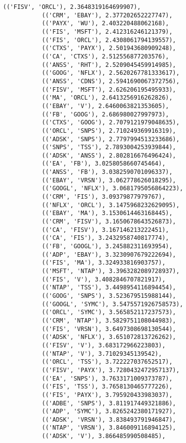 \documentclass[11pt]{article}
\begin{document}
\begin{Verbatim}[commandchars=\\\{\}]
           (('FISV', 'ORCL'), 2.3648319164699907),
           (('CRM', 'EBAY'), 2.377202652227747),
           (('PAYX', 'WU'), 2.403220488062168),
           (('FIS', 'MSFT'), 2.412316246121379),
           (('FIS', 'ORCL'), 2.4308061794139557),
           (('CTXS', 'PAYX'), 2.501943680909248),
           (('CA', 'CTXS'), 2.512556877203576),
           (('ANSS', 'RHT'), 2.5209045459914985),
           (('GOOG', 'NFLX'), 2.5620267781333617),
           (('ANSS', 'CDNS'), 2.5941690067372756),
           (('FISV', 'MSFT'), 2.626206195495933),
           (('MA', 'ORCL'), 2.6413256916262826),
           (('EBAY', 'V'), 2.6460063821353605),
           (('FB', 'GOOG'), 2.686980027997973),
           (('CTXS', 'GOOG'), 2.7079121979048635),
           (('ORCL', 'SNPS'), 2.710249369916319),
           (('ADSK', 'SNPS'), 2.7797994513233686),
           (('SNPS', 'TSS'), 2.7893004253939844),
           (('ADSK', 'ANSS'), 2.802816676496424),
           (('EA', 'FB'), 3.0258058660745464),
           (('ANSS', 'FB'), 3.0382590701096337),
           (('EBAY', 'VRSN'), 3.062778626018295),
           (('GOOGL', 'NFLX'), 3.0681795056864223),
           (('CRM', 'FIS'), 3.09379877979767),
           (('NFLX', 'ORCL'), 3.1475968232629095),
           (('EBAY', 'MA'), 3.1530614463168445),
           (('CRM', 'FISV'), 3.1650678643526873),
           (('CA', 'FISV'), 3.167146213222451),
           (('CA', 'FIS'), 3.2432958740817774),
           (('FB', 'GOOGL'), 3.245882311693954),
           (('ADP', 'EBAY'), 3.3230907679222694),
           (('FIS', 'MA'), 3.324933816903757),
           (('MSFT', 'NTAP'), 3.3963282089728937),
           (('FIS', 'V'), 3.4082846707821917),
           (('NTAP', 'TSS'), 3.4498954116894454),
           (('GOOG', 'SNPS'), 3.523679515988144),
           (('GOOGL', 'SYMC'), 3.5475571926758573),
           (('ORCL', 'SYMC'), 3.565852117237573),
           (('CRM', 'NTAP'), 3.5829751108044983),
           (('FIS', 'VRSN'), 3.6497308698130544),
           (('ADSK', 'NFLX'), 3.651072813726262),
           (('FISV', 'V'), 3.683172966223803),
           (('NTAP', 'V'), 3.71029345139542),
           (('ORCL', 'TSS'), 3.722227037652517),
           (('FISV', 'PAYX'), 3.7280432472957137),
           (('EA', 'SNPS'), 3.7633171009373787),
           (('FIS', 'TSS'), 3.7658130465777226),
           (('FIS', 'PAYX'), 3.795920433983037),
           (('ADBE', 'SNPS'), 3.811917449321886),
           (('ADP', 'SYMC'), 3.8265242380171927),
           (('ADSK', 'VRSN'), 3.838493791946847),
           (('NTAP', 'VRSN'), 3.846009116894125),
           (('ADSK', 'V'), 3.866485990508485),

\end{Verbatim}
\end{document}

